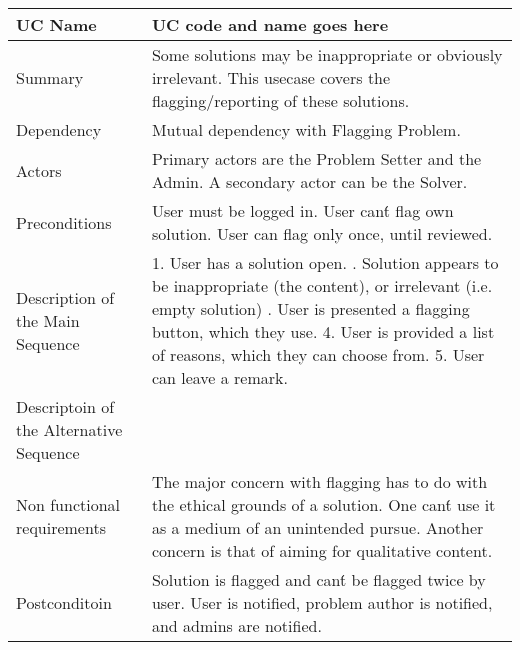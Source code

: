 \begin{table}[htbp]
\centering
\begin{tabularx}{\textwidth}{|l|X|}
\hline
UC Name & UC code and name goes here \\ \hline

Summary &  Some solutions may be inappropriate or obviously irrelevant. This usecase covers the flagging/reporting of these solutions. \\ \hline

Dependency & Mutual dependency with Flagging Problem. \\ \hline

Actors & Primary actors are the Problem Setter and the Admin. A secondary actor can be the Solver. \\ \hline

Preconditions & \- User must be logged in. \newline \- User can\'t flag own solution. \newline \- User can flag only once, until reviewed. \\ \hline

Description of the Main Sequence & 1. User has a solution open. \newline 2. Solution appears to be inappropriate (the content), or irrelevant (i.e. empty solution) \newline 3. User is presented a flagging button, which they use. 4. User is provided a list of reasons, which they can choose from. 5. User can leave a remark. \\ \hline

Descriptoin of the Alternative Sequence & \- \\ \hline

Non functional requirements & \- The major concern with flagging has to do with the ethical grounds of a solution. One can\'t use it as a medium of an unintended pursue. \newline \- Another concern is that of aiming for qualitative content. \\ \hline

Postconditoin & \- Solution is flagged and can\'t be flagged twice by user. \newline \- User is notified, problem author is notified, and admins are notified. \\ \hline

\end{tabularx}
\end{table}

